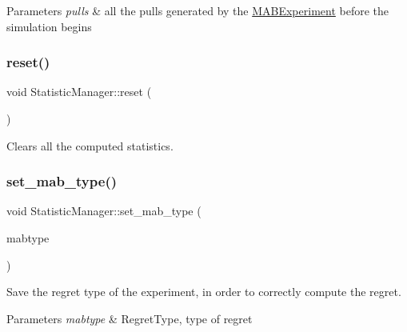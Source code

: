 \begin{DoxyParams}{Parameters}
{\em pulls} & all the pulls generated by the \mbox{\hyperlink{class_m_a_b_experiment}{M\+A\+B\+Experiment}} before the simulation begins \\
\hline
\end{DoxyParams}
\mbox{\label{class_statistic_manager_a705cc1ab2a751e9a6bb33497ebd7dd8d}} 
\subsubsection{\texorpdfstring{reset()}{reset()}}
{\footnotesize\ttfamily void Statistic\+Manager\+::reset (\begin{DoxyParamCaption}{ }\end{DoxyParamCaption})}



Clears all the computed statistics. 

\mbox{\label{class_statistic_manager_a8b5cc66719690cbb8dcc55e736cd90b7}} 
\subsubsection{\texorpdfstring{set\+\_\+mab\+\_\+type()}{set\_mab\_type()}}
{\footnotesize\ttfamily void Statistic\+Manager\+::set\+\_\+mab\+\_\+type (\begin{DoxyParamCaption}\item[{\mbox{\hyperlink{mab_8h_ab8d3b06b9f83219c5bb8daa68136f908}{Regret\+Type}}}]{mabtype }\end{DoxyParamCaption})}



Save the regret type of the experiment, in order to correctly compute the regret. 


\begin{DoxyParams}{Parameters}
{\em mabtype} & Regret\+Type, type of regret \\
\hline
\end{DoxyParams}
\mbox{\label{class_statistic_manager_a964a37aed52de5b4ec19369a452b79b1}} 

